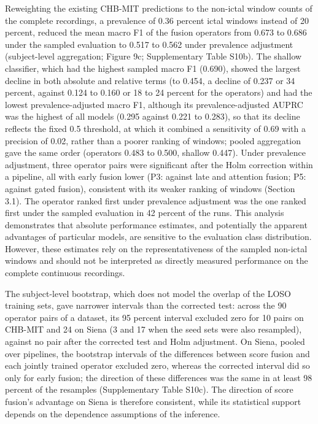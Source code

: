 \documentclass[11pt,a4paper]{article}
\begin{document}
Reweighting the existing CHB-MIT predictions to the non-ictal window counts of the
complete recordings, a prevalence of 0.36 percent ictal windows instead of 20 percent,
reduced the mean macro F1 of the fusion operators from 0.673 to 0.686 under the sampled
evaluation to 0.517 to 0.562 under prevalence adjustment (subject-level aggregation;
Figure 9c; Supplementary Table S10b). The shallow classifier, which had the highest
sampled macro F1 (0.690), showed the largest decline in both absolute and relative terms
(to 0.454, a decline of 0.237 or 34 percent, against 0.124 to 0.160 or 18 to 24 percent
for the operators) and had the lowest prevalence-adjusted macro F1, although its prevalence-adjusted AUPRC was the highest of all models (0.295 against 0.221 to 0.283), so that its decline reflects the fixed 0.5 threshold, at which it combined a sensitivity of 0.69 with a precision of 0.02, rather than a poorer ranking of windows; pooled aggregation
gave the same order (operators 0.483 to 0.500, shallow 0.447). Under prevalence
adjustment, three operator pairs were significant after the Holm correction within a
pipeline, all with early fusion lower (P3: against late and attention fusion; P5:
against gated fusion), consistent with its weaker ranking of windows (Section 3.1). The operator ranked first
under prevalence adjustment was the one ranked first under the sampled evaluation in 42
percent of the runs. This analysis demonstrates that absolute performance estimates, and
potentially the apparent advantages of particular models, are sensitive to the
evaluation class distribution. However, these estimates rely on the representativeness of
the sampled non-ictal windows and should not be interpreted as directly measured
performance on the complete continuous recordings.

The subject-level bootstrap, which does not model the overlap of the LOSO training sets,
gave narrower intervals than the corrected test: across the 90 operator pairs of a
dataset, its 95 percent interval excluded zero for 10 pairs on CHB-MIT and 24 on Siena
(3 and 17 when the seed sets were also resampled), against no pair after the corrected
test and Holm adjustment. On Siena, pooled over pipelines, the bootstrap intervals of the
differences between score fusion and each jointly trained operator excluded zero,
whereas the corrected interval did so only for early fusion; the direction of these
differences was the same in at least 98 percent of the resamples (Supplementary Table
S10c). The direction of score fusion's advantage on Siena is therefore consistent, while
its statistical support depends on the dependence assumptions of the inference.
\end{document}
